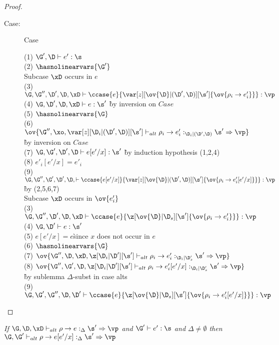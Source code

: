 \begin{proof}
\begin{description}
\item[Case:] Case
\begin{tabbing}
    (1) $\G', \D \vdash e' : \s$\\
    (2) $\hasnolinearvars{\G'}$\\
    Subcase $\xD$ occurs in $e$\\
    (3) $\G, \G'', \D', \D, \xD \vdash \ccase{e}{\var[z][\ov{\D}|(\D',\D)][\s'] \{\ov{\rho_i \to e'_i}\}} : \vp$\\
    (4) $\G, \D', \D, \xD \vdash e : \s'$ \` by inversion on $Case$\\
    (5) $\hasnolinearvars{\G}$\\
    (6) $\ov{\G'', \xo, \var[z][\D_i|(\D',\D)][\s'] \vdash_{alt} \rho_i \to e'_i :_{\D_i|(\D',\D)} \s' \Rightarrow \vp}$\` by inversion on $Case$\\
    (7) $\G, \G', \D', \D \vdash e[e'/x] : \s'$ \` by induction hypothesis (1,2,4)\\
    (8) $e'_i[e'/x]=e'_i$\\
    (9) $\G, \G'', \G', \D', \D, \vdash \ccase{e[e'/x]}{\var[z][\ov{\D}|(\D',\D)][\s'] \{\ov{\rho_i \to e'_i[e'/x]}\}} : \vp$\` by (2,5,6,7)\\
    Subcase $\xD$ occurs in $\ov{e'_i}$\\
    (3) $\G, \G'', \D', \D, \xD \vdash \ccase{e}{\z[\ov{\D}|\D_s][\s'] \{\ov{\rho_i \to e'_i}\}} : \vp$\\
    (4) $\G,\D' \vdash e : \s'$\\
    (5) $e[e'/x] = e$\`since $x$ does not occur in $e$\\
    (6) $\hasnolinearvars{\G}$\\
    (7) $\ov{\G'',\D,\xD,\z[\D_i|\D'][\s'] \vdash_{alt} \rho_i \to e'_i :_{\D_i|\D'_s} \s' \Rightarrow \vp}$\\
    (8) $\ov{\G'',\G',\D,\z[\D_i|\D'][\s'] \vdash_{alt} \rho_i \to e'_i[e'/x] :_{\D_i|\D'_s} \s' \Rightarrow \vp}$\\\`by sublemma $\Delta$-subst in case alts\\
    (9) $\G,\G',\G'',\D,\D' \vdash \ccase{e}{\z[\ov{\D}|\D_s][\s'] \{\ov{\rho_i \to e'_i[e'/x]}\}} : \vp$\\
\end{tabbing}

\end{description}

\end{proof}


\begin{sublemma}
\emph{If $\G, \D, \xD \vdash_{alt} \rho \to e :_\Delta \s' \Rightarrow \vp$ and
    $\G' \vdash e' : \s$ and $\Delta \neq \emptyset$ then $\G, \G' \vdash_{alt} \rho \to e[e'/x] :_\Delta \s' \Rightarrow \vp$}
\end{sublemma}

